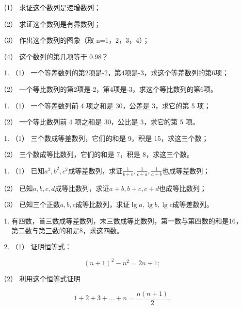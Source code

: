 （1） 求证这个数列是递增数列；

（2） 求证这个数列是有界数列；

（3） 作出这个数列的图象（取 n=1，2，3，4）；

（4） 这个数列的第几项等于 0.98？

\begin{enumerate}[start=3]
\item
  （1） 一个等差数列的第2项是-2，第4项是-3，求这个等差数列的第6项；
\end{enumerate}

（2） 一个等比数列的第2项是-2，第4项是-3，求这个等比数列的第6项。

\begin{enumerate}[start=4]
\item
  （1） 一个等差数列前 4 项之和是 30，公差是 3，求它的第 5 项；
\end{enumerate}

（2） 一个等比数列前 4 项之和是 30，公比是 3，求它的第 5 项。

\begin{enumerate}[start=5]
\item
  （1） 三个数成等差数列，它们的和是 9，积是 15，求这三个数；
\end{enumerate}

（2） 三个数成等比数列，它们的和是 7，积是 8，求这三个数。

\begin{enumerate}[start=6]
\item
  （1）
  已知\(a^2, b^2, c^2\)成等差数列，求证\(\frac{1}{b + c}, \frac{1}{c + a}, \frac{1}{a + b}\)也成等差数列；
\end{enumerate}

（2）
已知\(a, b, c, d\)成等比数列，求证\(a + b, b + c, c + d\)也成等比数列；

（3）
已知三个正数\(a, b, c\)成等比数列，求证\(\lg a, \lg b, \lg c\)成等差数列。

\begin{enumerate}[start=7]
\item
  有四数，首三数成等差数列，末三数成等比数列，第一数与第四数的和是16，第二数与第三数的和是8，求这四数。
\item
  （1） 证明恒等式：
\end{enumerate}

\[
(n + 1)^{2} - n^{2} = 2 n + 1;
\]

（2） 利用这个恒等式证明

\[
1 + 2 + 3 + \dots + n = \frac{n (n + 1)}{2}.
\]

